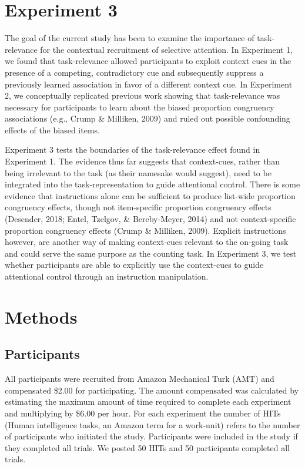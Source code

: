 \documentclass[english,,man,floatsintext]{apa6}
\begin{document}
\hypertarget{experiment-3}{%
\section{Experiment 3}\label{experiment-3}}

The goal of the current study has been to examine the importance of task-relevance for the contextual recruitment of selective attention. In Experiment 1, we found that task-relevance allowed participants to exploit context cues in the presence of a competing, contradictory cue and subsequently suppress a previously learned association in favor of a different context cue. In Experiment 2, we conceptually replicated previous work showing that task-relevance was necessary for participants to learn about the biased proportion congruency associations (e.g., Crump \& Milliken, 2009) and ruled out possible confounding effects of the biased items.

Experiment 3 tests the boundaries of the task-relevance effect found in Experiment 1. The evidence thus far suggests that context-cues, rather than being irrelevant to the task (as their namesake would suggest), need to be integrated into the task-representation to guide attentional control. There is some evidence that instructions alone can be sufficient to produce list-wide proportion congruency effects, though not item-specific proportion congruency effects (Desender, 2018; Entel, Tzelgov, \& Bereby-Meyer, 2014) and not context-specific proportion congruency effects (Crump \& Milliken, 2009). Explicit instructions however, are another way of making context-cues relevant to the on-going task and could serve the same purpose as the counting task. In Experiment 3, we test whether participants are able to explicitly use the context-cues to guide attentional control through an instruction manipulation.

\hypertarget{methods-2}{%
\section{Methods}\label{methods-2}}

\hypertarget{participants-2}{%
\subsection{Participants}\label{participants-2}}

All participants were recruited from Amazon Mechanical Turk (AMT) and compensated \$2.00 for participating. The amount compensated was calculated by estimating the maximum amount of time required to complete each experiment and multiplying by \$6.00 per hour. For each experiment the number of HITs (Human intelligence tasks, an Amazon term for a work-unit) refers to the number of participants who initiated the study. Participants were included in the study if they completed all trials. We posted 50 HITs and 50 participants completed all trials.
\end{document}
